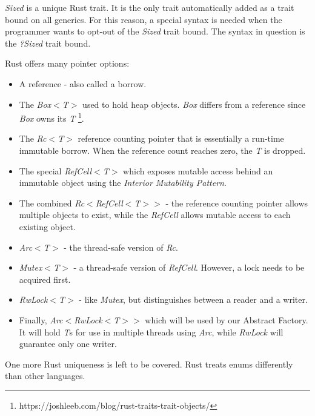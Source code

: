 \begin{notebox}
	\textit{Sized} is a unique Rust trait.
	It is the only trait automatically added as a trait bound on all generics.
	For this reason, a special syntax is needed when the programmer wants to opt-out of the \textit{Sized} trait bound.
	The syntax in question is the \textit{?Sized} trait bound. \cite{klabnik_2019_01}
\end{notebox}

Rust offers many pointer options: \cite{klabnik_2019_01}
\begin{itemize}
	\item A reference - also called a borrow.
	\item The \textit{Box$<$T$>$} used to hold heap objects.
	      \textit{Box} differs from a reference since \textit{Box} owns its \textit{T} \footnote{https://joshleeb.com/blog/rust-traits-trait-objects/}.
	\item The \textit{Rc$<$T$>$} reference counting pointer that is essentially a run-time immutable borrow.
	      When the reference count reaches zero, the \textit{T} is dropped.
	\item The special \textit{RefCell$<$T$>$} which exposes mutable access behind an immutable object using the \textit{Interior Mutability Pattern}.
	\item The combined \textit{Rc$<$RefCell$<$T$>$$>$} - the reference counting pointer allows multiple objects to exist, while the \textit{RefCell} allows mutable access to each existing object.
	\item \textit{Arc$<$T$>$} - the thread-safe version of \textit{Rc}.
	\item \textit{Mutex$<$T$>$} - a thread-safe version of \textit{RefCell}.
	      However, a lock needs to be acquired first.
	\item \textit{RwLock$<$T$>$} - like \textit{Mutex}, but distinguishes between a reader and a writer.
	\item Finally, \textit{Arc$<$RwLock$<$T$>$$>$} which will be used by our Abstract Factory.
	      It will hold \textit{T}s for use in multiple threads using \textit{Arc}, while \textit{RwLock} will guarantee only one writer.
\end{itemize}

One more Rust uniqueness is left to be covered. Rust treats enums differently than other languages.

